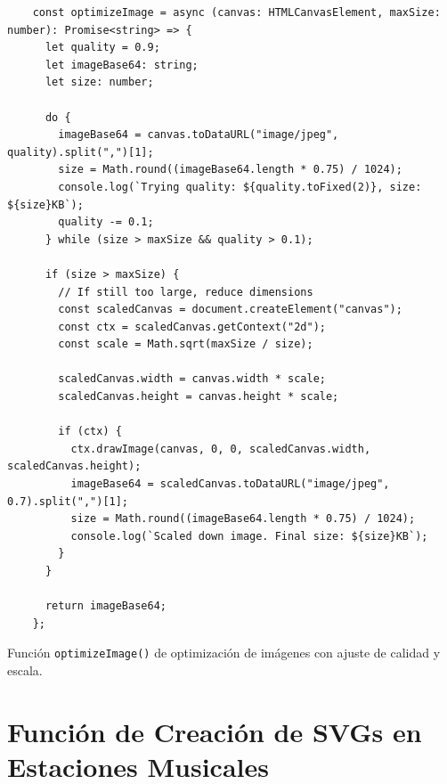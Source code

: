 \begin{ifalgorithm}[H]
    \begin{lstlisting}
    const optimizeImage = async (canvas: HTMLCanvasElement, maxSize: number): Promise<string> => {
      let quality = 0.9;
      let imageBase64: string;
      let size: number;

      do {
        imageBase64 = canvas.toDataURL("image/jpeg", quality).split(",")[1];
        size = Math.round((imageBase64.length * 0.75) / 1024);
        console.log(`Trying quality: ${quality.toFixed(2)}, size: ${size}KB`);
        quality -= 0.1;
      } while (size > maxSize && quality > 0.1);

      if (size > maxSize) {
        // If still too large, reduce dimensions
        const scaledCanvas = document.createElement("canvas");
        const ctx = scaledCanvas.getContext("2d");
        const scale = Math.sqrt(maxSize / size);

        scaledCanvas.width = canvas.width * scale;
        scaledCanvas.height = canvas.height * scale;

        if (ctx) {
          ctx.drawImage(canvas, 0, 0, scaledCanvas.width, scaledCanvas.height);
          imageBase64 = scaledCanvas.toDataURL("image/jpeg", 0.7).split(",")[1];
          size = Math.round((imageBase64.length * 0.75) / 1024);
          console.log(`Scaled down image. Final size: ${size}KB`);
        }
      }

      return imageBase64;
    };
    \end{lstlisting}
    \caption{Función \texttt{optimizeImage()} de optimización de imágenes con ajuste de calidad y escala.}
    \label{alg:optimize_image}
\end{ifalgorithm}

\section*{Función de Creación de SVGs en Estaciones Musicales}

